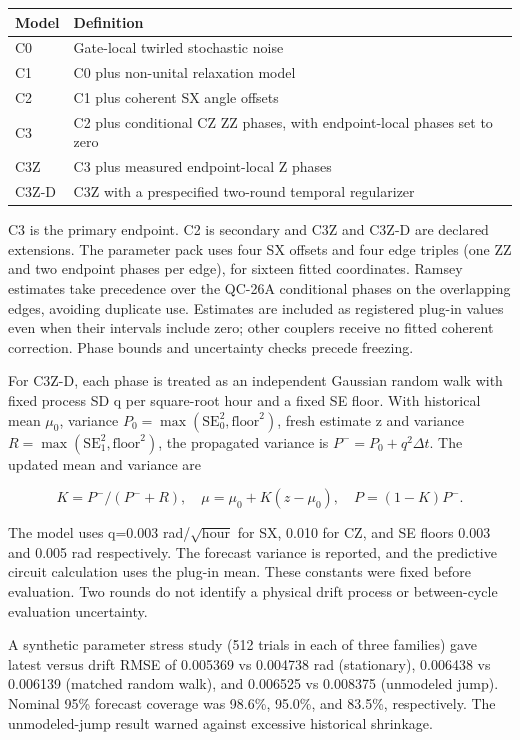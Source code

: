 \documentclass[11pt,a4paper]{article}
\begin{document}
\begin{center}
\centering
\normalsize
\begin{tabularx}{\linewidth}{@{}lY@{}}
\toprule
Model & Definition \\
\midrule
C0 & Gate-local twirled stochastic noise \\
C1 & C0 plus non-unital relaxation model \\
C2 & C1 plus coherent SX angle offsets \\
C3 & C2 plus conditional CZ ZZ phases, with endpoint-local phases set to zero \\
C3Z & C3 plus measured endpoint-local Z phases \\
C3Z-D & C3Z with a prespecified two-round temporal regularizer \\
\bottomrule
\end{tabularx}
\end{center}

C3 is the primary endpoint. C2 is secondary and C3Z and C3Z-D are declared extensions. The parameter pack uses four SX offsets and four edge triples (one ZZ and two endpoint phases per edge), for sixteen fitted coordinates. Ramsey estimates take precedence over the QC-26A conditional phases on the overlapping edges, avoiding duplicate use. Estimates are included as registered plug-in values even when their intervals include zero; other couplers receive no fitted coherent correction. Phase bounds and uncertainty checks precede freezing.

For C3Z-D, each phase is treated as an independent Gaussian random walk with fixed process SD q per square-root hour and a fixed SE floor. With historical mean $\mu_0$, variance $P_0=\max(\mathrm{SE}_0^2,\mathrm{floor}^2)$, fresh estimate z and variance $R=\max(\mathrm{SE}_1^2,\mathrm{floor}^2)$, the propagated variance is $P^-=P_0+q^2\Delta t$. The updated mean and variance are

\[
K=P^-/(P^-+R),\quad
\mu=\mu_0+K(z-\mu_0),\quad P=(1-K)P^-.
\]

The model uses q=0.003 rad/$\sqrt{\mathrm{hour}}$ for SX, 0.010 for CZ, and SE floors 0.003 and 0.005 rad respectively. The forecast variance is reported, and the predictive circuit calculation uses the plug-in mean. These constants were fixed before evaluation. Two rounds do not identify a physical drift process or between-cycle evaluation uncertainty.

A synthetic parameter stress study (512 trials in each of three families) gave latest versus drift RMSE of 0.005369 vs 0.004738 rad (stationary), 0.006438 vs 0.006139 (matched random walk), and 0.006525 vs 0.008375 (unmodeled jump). Nominal 95\% forecast coverage was 98.6\%, 95.0\%, and 83.5\%, respectively. The unmodeled-jump result warned against excessive historical shrinkage.
\end{document}
